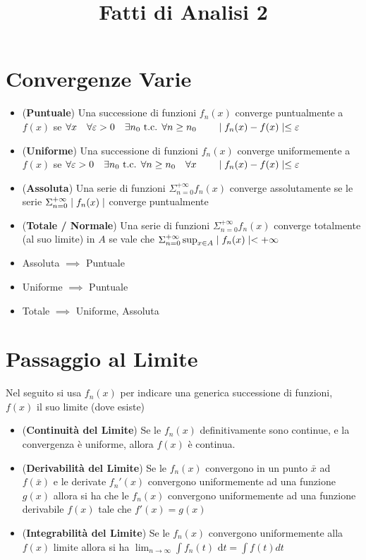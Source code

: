 \documentclass[a4paper,NoNotes,GeneralMath]{stdmdoc}
\newcommand{\de}{\mbox{  d}}
\begin{document}
	\title{Fatti di Analisi 2}
	\author{}

	\section*{Convergenze Varie}
	\begin{itemize}
		\item ({\bf Puntuale}) Una successione di funzioni $f_n(x)$ converge puntualmente a $f(x)$ se $\forall x \quad \forall \varepsilon > 0 \quad \exists n_0 \mbox{ t.c. } \forall n \ge n_0 \qquad \mid f_n(x) - f(x) \mid \le \varepsilon$
		\item ({\bf Uniforme}) Una successione di funzioni $f_n(x)$ converge uniformemente a $f(x)$ se $\forall \varepsilon > 0 \quad \exists n_0 \mbox{ t.c. } \forall n \ge n_0 \quad \forall x \qquad \mid f_n(x) - f(x) \mid \le \varepsilon$
		\item ({\bf Assoluta}) Una serie di funzioni $\Sigma_{n=0}^{+\infty} f_n(x)$ converge assolutamente se le serie $\Sigma_{n=0}^{+\infty} \mid f_n(x) \mid$ converge puntualmente
		\item ({\bf Totale / Normale}) Una serie di funzioni $\Sigma_{n=0}^{+\infty} f_n(x)$ converge totalmente (al suo limite) in $A$ se vale che $\Sigma_{n=0}^{+\infty} \sup_{x\in A} \mid f_n(x) \mid < +\infty$
		\item Assoluta $\implies$ Puntuale
		\item Uniforme $\implies$ Puntuale
		\item Totale $\implies$ Uniforme, Assoluta
	\end{itemize}

	\section*{Passaggio al Limite}
	Nel seguito si usa $f_n(x)$ per indicare una generica successione di funzioni, $f(x)$ il suo limite (dove esiste)
	\begin{itemize}
		\item ({\bf Continuità del Limite}) Se le $f_n(x)$ definitivamente sono continue, e la convergenza è uniforme, allora $f(x)$ è continua.
		\item ({\bf Derivabilità del Limite}) Se le $f_n(x)$ convergono in un punto $\bar{x}$ ad $f(\bar{x})$ e le derivate $f_n'(x)$ convergono uniformemente ad una funzione $g(x)$ allora si ha che le $f_n(x)$ convergono uniformemente ad una funzione derivabile $f(x)$ tale che $f'(x) = g(x)$
		\item ({\bf Integrabilità del Limite}) Se le $f_n(x)$ convergono uniformemente alla $f(x)$ limite allora si ha $\lim_{n \rightarrow \infty} \int f_n(t) \de t = \int f(t) dt$
	\end{itemize}
\end{document}
